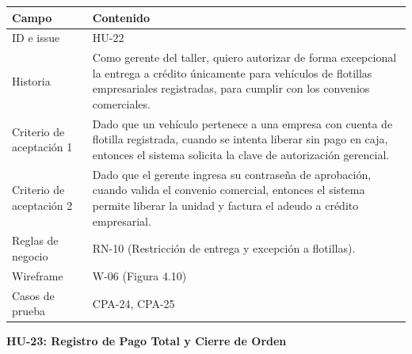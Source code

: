 {\def\LTcaptype{none} %
\begin{longtable}[]{@{}
  >{\raggedright\arraybackslash}p{}
  >{\raggedright\arraybackslash}p{}@{}}
\toprule\noalign{}
\begin{minipage}[b]{\linewidth}\raggedright
\textbf{Campo}
\end{minipage} & \begin{minipage}[b]{\linewidth}\raggedright
\textbf{Contenido}
\end{minipage} \\
\midrule\noalign{}
\endhead
\bottomrule\noalign{}
\endlastfoot
ID e issue & HU-22 \\
Historia & Como gerente del taller, quiero autorizar de forma
excepcional la entrega a crédito únicamente para vehículos de flotillas
empresariales registradas, para cumplir con los convenios
comerciales. \\
Criterio de aceptación 1 & Dado que un vehículo pertenece a una empresa
con cuenta de flotilla registrada, cuando se intenta liberar sin pago en
caja, entonces el sistema solicita la clave de autorización
gerencial. \\
Criterio de aceptación 2 & Dado que el gerente ingresa su contraseña de
aprobación, cuando valida el convenio comercial, entonces el sistema
permite liberar la unidad y factura el adeudo a crédito empresarial. \\
Reglas de negocio & RN-10 (Restricción de entrega y excepción a
flotillas). \\
Wireframe & W-06 (Figura 4.10) \\
Casos de prueba & CPA-24, CPA-25 \\
\end{longtable}
}

\textbf{HU-23: Registro de Pago Total y Cierre de Orden}

